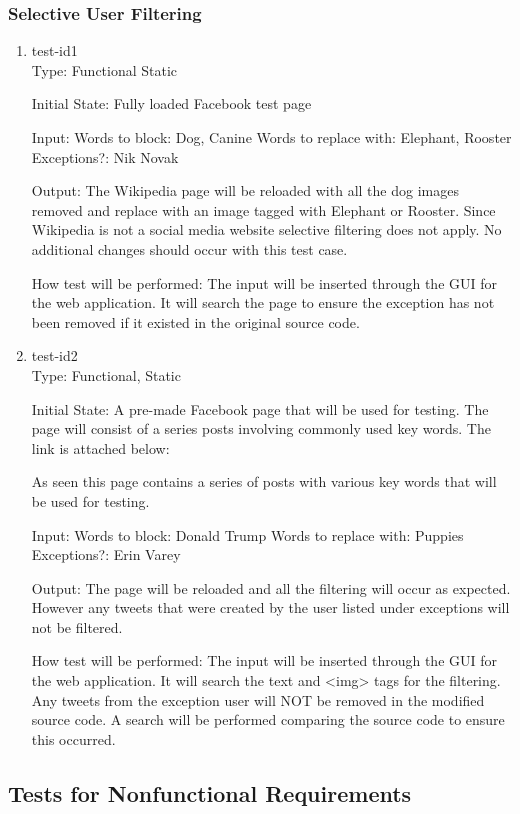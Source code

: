 \documentclass[12pt, titlepage]{article}
\begin{document}
\subsubsection{Selective User Filtering}
\begin{enumerate}
\item{test-id1\\}
Type: Functional Static
					
Initial State: Fully loaded Facebook test page
					
Input: Words to block: Dog, Canine
Words to replace with: Elephant, Rooster
Exceptions?: Nik Novak
					
Output: The Wikipedia page will be reloaded with all the dog images removed and replace with an image tagged with Elephant or Rooster. Since Wikipedia is not a social media website selective filtering does not apply. No additional changes should occur with this test case.
					
How test will be performed: The input will be inserted through the GUI for the web application. It will search the page to ensure the exception has not been removed if it existed in the original source code.
					
\item{test-id2\\}
Type: Functional, Static
					
Initial State: A pre-made Facebook page that will be used for testing. The page will consist of  a series posts involving commonly used key words. The link is attached below:

As seen this page contains a series of posts with various key words that will be used for testing.
					
Input:  Words to block: Donald Trump
Words to replace with: Puppies
Exceptions?: Erin Varey
					
Output: The page will be reloaded and all the filtering will occur as expected. However any tweets that were created by the user listed under exceptions will not be filtered.

How test will be performed: The input will be inserted through the GUI for the web application. It will search the text and <img> tags for the filtering. Any tweets from the exception user will NOT be removed in the modified source code. A search will be performed comparing the source code to ensure this occurred.
\end{enumerate}
\subsection{Tests for Nonfunctional Requirements}
\end{document}
